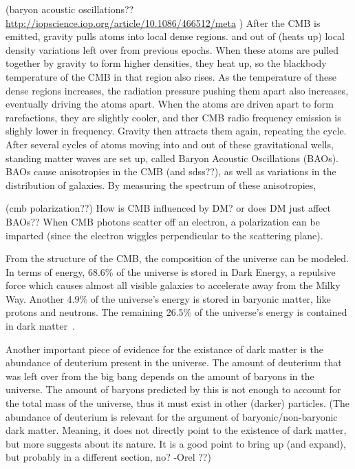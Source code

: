     {\color{red}(baryon acoustic oscillations?? \url{http://iopscience.iop.org/article/10.1086/466512/meta} )}
    After the CMB is emitted, gravity pulls atoms into local dense regions.
    and out of (heats up) local density variations left over from previous epochs.
    When these atoms are pulled together by gravity to form higher densities, they heat up, so the blackbody temperature of the CMB in that region also rises.
    As the temperature of these dense regions increases, the radiation pressure pushing them apart also increases, eventually driving the atoms apart.
    When the atoms are driven apart to form rarefactions, they are slightly cooler, and ther CMB radio frequency emission is slighly lower in frequency.
    Gravity then attracts them again, repeating the cycle.
    After several cycles of atoms moving into and out of these gravitational wells, standing matter waves are set up, called Baryon Acoustic Oscillations (BAOs).
    BAOs cause anisotropies in the CMB (and sdss??), as well as variations in the distribution of galaxies.
    By measuring the spectrum of these anisotropies,
    \cite{bao_SDSS,bao_6df}
    
    {\color{red}(cmb polarization??)}
    How is CMB influenced by DM? or does DM just affect BAOs??
    When CMB photons scatter off an electron, a polarization can be imparted (since the electron wiggles perpendicular to the scattering plane).
    
    From the structure of the CMB, the composition of the universe can be modeled.
    In terms of energy, 68.6\% of the universe is stored in Dark Energy, a repulsive force which causes almost all visible galaxies to accelerate away from the Milky Way.
    Another 4.9\% of the universe's energy is stored in baryonic matter, like protons and neutrons.
    The remaining 26.5\% of the universe's energy is contained in dark matter~\cite{planck2015}.

    Another important piece of evidence for the existance of dark matter is the abundance of deuterium present in the universe.
    The amount of deuterium that was left over from the big bang depends on the amount of baryons in the universe.
    The amount of baryons predicted by this is not enough to account for the total mass of the universe, thus it must exist in other (darker) particles.
    {\color{red}(The abundance of deuterium is relevant for the argument of baryonic/non-baryonic dark matter. Meaning, it does not directly point to the existence of dark matter, but more suggests about its nature. It is a good point to bring up (and expand), but probably in a different section, no? -Orel ??)}

